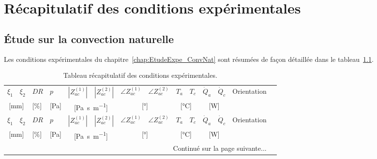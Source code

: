 \chapter{Récapitulatif des conditions expérimentales}
\section{\'Etude sur la convection naturelle}
Les conditions expérimentales du chapitre~\ref{chap:EtudeExpe_ConvNat} sont résumées de façon détaillée dans le tableau~\ref{tab:RecapCondExpe}.

\begin{longtable}{llll llll llll ll}
	\caption{Tableau récapitulatif des conditions expérimentales.}
	\label{tab:RecapCondExpe}\\%
	
	\hline
	$\xi_1$ & $\xi_2$  & $DR$ & $p$ & $|Z_{ac}^{(1)}|$ & $|Z_{ac}^{(2)}|$& $\angle Z_{ac}^{(1)}$  & $\angle Z_{ac}^{(2)}$ & $T_a$  & $T_c$ & $\dot Q_a$ & $\dot Q_c$  & \multirow{2}{*}{Orientation} \\%
	
	\multicolumn{2}{c}{[\unit{\milli\meter}]} & [\unit{\percent}] & [\unit{\pascal}] & \multicolumn{2}{c}{[\unit{\pascal\second\per\meter}]} & \multicolumn{2}{c}{[\unit{\degree}]}  & \multicolumn{2}{c}{[\unit{\degreeCelsius}]} &\multicolumn{2}{c}{[\unit{\watt}]} &  \\\hline\hline \endfirsthead
	
	\hline
	$\xi_1$ & $\xi_2$  & $DR$ & $p$ & $|Z_{ac}^{(1)}|$ & $|Z_{ac}^{(2)}|$& $\angle Z_{ac}^{(1)}$  & $\angle Z_{ac}^{(2)}$ & $T_a$  & $T_c$ & $\dot Q_a$ & $\dot Q_c$  & \multirow{2}{*}{Orientation} \\%
	
	\multicolumn{2}{c}{[\unit{\milli\meter}]} & [\unit{\percent}] & [\unit{\pascal}] & \multicolumn{2}{c}{[\unit{\pascal\second\per\meter}]} & \multicolumn{2}{c}{[\unit{\degree}]}  & \multicolumn{2}{c}{[\unit{\degreeCelsius}]} &\multicolumn{2}{c}{[\unit{\watt}]} &  \\\hline\hline \endhead
	
	\hline
	\multicolumn{13}{r}{Continué sur la page suivante...} \endfoot
    \hline \endlastfoot
	

\end{longtable}
